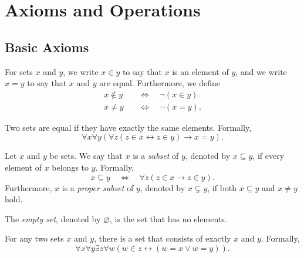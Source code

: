 \chapter{Axioms and Operations}
\section{Basic Axioms}
For sets $x$ and $y$, we write $x \in y$ to say that $x$ is an element of
$y$, and we write $x = y$ to say that $x$ and $y$ are equal.
Furthermore, we define
\begin{align*}
  x \notin y \quad &\Leftrightarrow \quad \neg(x \in y) \\
  x \neq y \quad &\Leftrightarrow \quad \neg(x = y).
\end{align*}

\begin{axiom}[Extensionality]
  Two sets are equal if they have exactly the same elements.
  Formally,
  \begin{equation*}
    \forall x \forall y (\forall z (z \in x \leftrightarrow z \in y) \to
    x = y).
  \end{equation*}
\end{axiom}

\begin{definition}
  Let $x$ and $y$ be sets.
  We say that $x$ is a \emph{subset} of $y$, denoted by $x \subseteq y$, if
  every element of $x$ belongs to $y$.
  Formally,
  \begin{equation*}
    x \subseteq y
    \quad \Leftrightarrow \quad
    \forall z (z \in x \to z \in y).
  \end{equation*}
  Furthermore, $x$ is a \emph{proper subset} of $y$, denoted by
  $x \subsetneq y$, if both $x \subseteq y$ and $x \neq y$ hold.
\end{definition}

\begin{definition}
  The \emph{empty set}, denoted by $\varnothing$, is the set that has no
  elements.
\end{definition}

\begin{axiom}[Pairing]
  For any two sets $x$ and $y$, there is a set that consists of exactly $x$ and
  $y$.
  Formally,
  \begin{equation*}
    \forall x \forall y \exists z \forall w (w \in z \leftrightarrow
    (w = x \vee w = y)).
  \end{equation*}
\end{axiom}

